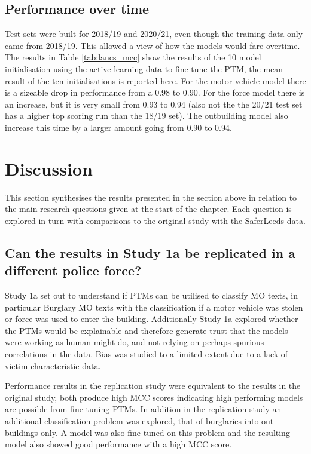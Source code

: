 \subsection{Performance over time} Test sets were built for 2018/19 and 2020/21, even though the training data only came from 2018/19. This allowed a view of how the models would fare overtime. The results in Table \ref{tab:lancs_mcc} show the results of the 10 model initialisation using the active learning data to fine-tune the PTM, the mean result of the ten initialisations is reported here. For the motor-vehicle model there is a sizeable drop in performance from a 0.98 to 0.90. For the force model there is an increase, but it is very small from 0.93 to 0.94 (also not the the 20/21 test set has a higher top scoring run than the 18/19 set). The outbuilding model also increase this time by a larger amount going from 0.90 to 0.94.


\section{Discussion} This section synthesises the results presented in the section above in relation to the main research questions given at the start of the chapter. Each question is explored in turn with comparisons to the original study with the SaferLeeds data.

\subsection{Can the results in Study 1a be replicated in a different police force?}Study 1a set out to understand if PTMs can be utilised to classify MO texts, in particular Burglary MO texts with the classification if a motor vehicle was stolen or force was used to enter the building. Additionally Study 1a explored whether the PTMs would be explainable and therefore generate trust that the models were working as human might do, and not relying on perhaps spurious correlations in the data. Bias was studied to a limited extent due to a lack of victim characteristic data.

Performance results in the replication study were equivalent to the results in the original study, both produce high MCC scores indicating high performing models are possible from fine-tuning PTMs. In addition in the replication study an additional classification problem was explored, that of burglaries into out-buildings only. A model was also fine-tuned on this problem and the resulting model also showed good performance with a high MCC score.

